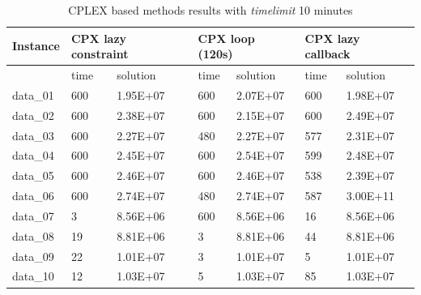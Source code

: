 \begin{table}[!h]
\caption{\textsc{CPLEX} based methods results with \textit{timelimit} 10 minutes}
\begin{tabular}{lllllll}
\hline
Instance & \multicolumn{2}{l}{\textbf{CPX lazy constraint}} & \multicolumn{2}{l}{\textbf{CPX loop (120s)}} & \multicolumn{2}{l}{\textbf{CPX lazy callback}} \\ \hline
         & time                  & solution                 & time                & solution               & time                 & solution                \\ \hline
data\_01 & 600                   & 1.95E+07                 & 600                 & 2.07E+07               & 600                  & 1.98E+07                \\
data\_02 & 600                   & 2.38E+07                 & 600                 & 2.15E+07               & 600                  & 2.49E+07                \\
data\_03 & 600                   & 2.27E+07                 & 480                 & 2.27E+07               & 577                  & 2.31E+07                \\
data\_04 & 600                   & 2.45E+07                 & 600                 & 2.54E+07               & 599                  & 2.48E+07                \\
data\_05 & 600                   & 2.46E+07                 & 600                 & 2.46E+07               & 538                  & 2.39E+07                \\
data\_06 & 600                   & 2.74E+07                 & 480                 & 2.74E+07               & 587                  & 3.00E+11                \\
data\_07 & 3                     & 8.56E+06                 & 600                 & 8.56E+06               & 16                   & 8.56E+06                \\
data\_08 & 19                    & 8.81E+06                 & 3                   & 8.81E+06               & 44                   & 8.81E+06                \\
data\_09 & 22                    & 1.01E+07                 & 3                   & 1.01E+07               & 5                    & 1.01E+07                \\
data\_10 & 12                    & 1.03E+07                 & 5                   & 1.03E+07               & 85                   & 1.03E+07                \\

\end{tabular}
\end{table}
